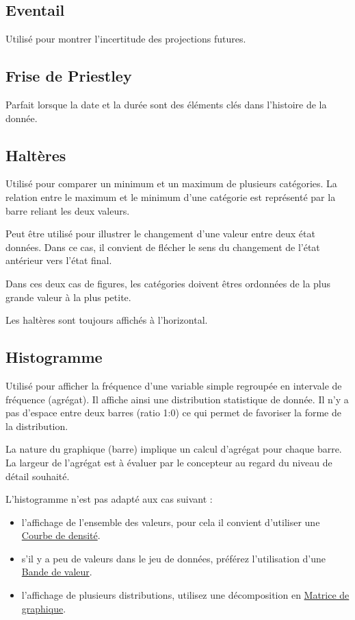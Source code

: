 \documentclass[a4paper,12pt]{article}
\begin{document}
\begin{multicols}{2}
\subsection*{Eventail}
\label{sec:org870d405}
Utilisé pour montrer l'incertitude des projections futures. \autocite{alansmithLexiqueVisuel}
\subsection*{Frise de Priestley}
\label{sec:orgad4afee}
Parfait lorsque la date et la durée sont des éléments clés dans l'histoire de la donnée. \autocite{alansmithLexiqueVisuel}
\subsection*{Haltères}
\label{sec:org6993650}
Utilisé pour comparer un minimum et un maximum de plusieurs catégories. \autocite{alansmithLexiqueVisuel} La relation entre le maximum et le minimum d'une catégorie est représenté par la barre reliant les deux valeurs. \autocite{mikeyiHowChooseRight2020}

Peut être utilisé pour illustrer le changement d'une valeur entre deux état données. Dans ce cas, il convient de flécher le sens du changement de l'état antérieur vers l'état final.

Dans ces deux cas de figures, les catégories doivent êtres ordonnées de la plus grande valeur à la plus petite.

Les haltères sont toujours affichés à l'horizontal.
\subsection*{Histogramme}
\label{sec:org90c37e0}
Utilisé pour afficher la fréquence d'une variable simple regroupée en intervale de fréquence (agrégat).\autocite{sosulskiGraphics2019} Il affiche ainsi une distribution statistique de donnée. Il n'y a pas d'espace entre deux barres (ratio 1:0) ce qui permet de favoriser la forme de la distribution. \autocite{alansmithLexiqueVisuel}

La nature du graphique (barre) implique un calcul d'agrégat pour chaque barre. \autocite{wilkeVisualizingDistributionsHistograms2019} La largeur de l'agrégat est à évaluer par le concepteur au regard du niveau de détail souhaité.\autocite{wilkeVisualizingDistributionsHistograms2019}

L'histogramme n'est pas adapté aux cas suivant :
\begin{itemize}
\item l'affichage de l'ensemble des valeurs, pour cela il convient d'utiliser une \hyperref[sec:org5d62106]{Courbe de densité}. \autocite{wilkeVisualizingDistributionsHistograms2019}
\item s'il y a peu de valeurs dans le jeu de données, \autocite{weissgerberBarLineGraphs2015} préférez l'utilisation d'une \hyperref[sec:orgcfed620]{Bande de valeur}.
\item l'affichage de plusieurs distributions,\autocite{wilkeVisualizingDistributionsHistograms2019} utilisez une décomposition en \hyperref[sec:org10b09f5]{Matrice de graphique}.
\end{itemize}


\end{multicols}
\end{document}

